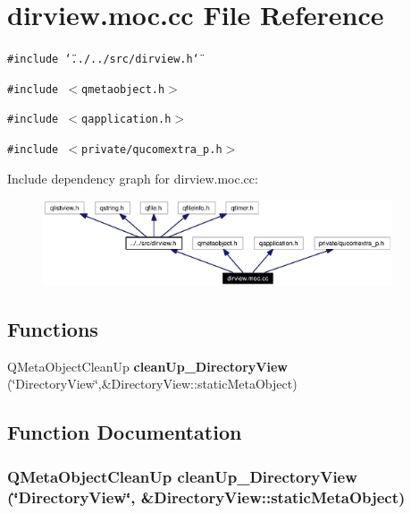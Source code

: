 \section{dirview.moc.cc File Reference}
\label{dirview_8moc_8cc}


{\tt \#include \char`\"{}../../src/dirview.h\char`\"{}}\par
{\tt \#include $<$qmetaobject.h$>$}\par
{\tt \#include $<$qapplication.h$>$}\par
{\tt \#include $<$private/qucomextra\_\-p.h$>$}\par


Include dependency graph for dirview.moc.cc:\begin{figure}[H]
\begin{center}
\leavevmode
\includegraphics[width=293pt]{dirview_8moc_8cc__incl}
\end{center}
\end{figure}
\subsection*{Functions}
\begin{CompactItemize}
\item 
QMeta\-Object\-Clean\-Up {\bf clean\-Up\_\-Directory\-View} (\char`\"{}Directory\-View\char`\"{},\&Directory\-View::static\-Meta\-Object)
\end{CompactItemize}


\subsection{Function Documentation}
\subsubsection{\setlength{\rightskip}{0pt plus 5cm}QMeta\-Object\-Clean\-Up clean\-Up\_\-Directory\-View (\char`\"{}Directory\-View\char`\"{}, \&Directory\-View::static\-Meta\-Object)\hspace{0.3cm}{\tt  [static]}}\label{dirview_8moc_8cc_a0}


